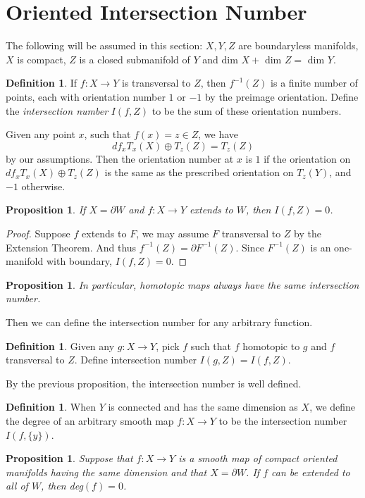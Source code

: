 \documentclass[psamsfonts]{amsart}
\newtheorem{prop}[theorem]{Proposition}
\theoremstyle{definition}
\newtheorem{defn}[theorem]{Definition}
\theoremstyle{remark}
\numberwithin{equation}{section}
\begin{document}
	\section{Oriented Intersection Number}
		The following will be assumed in this section: $X,Y,Z$ are boundaryless manifolds, $X$ is compact, $Z$ is a closed submanifold of $Y$ and dim $X +$ dim $Z = $ dim $Y$.
		\begin{defn}
			If $f: X \to Y$ is transversal to $Z$, then $f^{-1}(Z)$ is a finite number of points, each with orientation number $1$ or $-1$ by the preimage orientation. Define the \textit{intersection number} $I(f,Z)$ to be the sum of these orientation numbers.
		\end{defn}
		Given any point $x$, such that $f(x) = z \in Z$, we have
		\begin{equation}
			df_xT_x(X) \oplus T_z(Z) = T_z(Z)	
		\end{equation}
		by our assumptions. Then the orientation number at $x$ is $1$ if the orientation on $df_xT_x(X) \oplus T_z(Z)$ is the same as the prescribed orientation on $T_z(Y)$, and $-1$ otherwise.\\
		\begin{prop}
			If $X = \partial W$ and $f:X \to Y$ extends to $W$, then $I(f,Z)=0$.
		\end{prop}
		\begin{proof}
			Suppose $f$ extends to $F$, we may assume $F$ transversal to $Z$ by the Extension Theorem. And thus $f^{-1}(Z) = \partial F^{-1}(Z)$. Since $F^{-1}(Z)$ is an one-manifold with boundary, $I(f,Z)=0$. 	
		\end{proof}
		\begin{prop}
			In particular, homotopic maps always have the same intersection number.
		\end{prop}
		Then we can define the intersection number for any arbitrary function.
		\begin{defn}
			Given any $g: X \to Y$, pick $f$ such that $f$ homotopic to $g$ and $f$ transversal to $Z$. Define intersection number $I(g,Z) = I(f,Z)$.
		\end{defn}			 
		By the previous proposition, the intersection number is well defined.
		\begin{defn}
			When $Y$ is connected and has the same dimension as $X$, we define the degree of an arbitrary smooth map $f:X \to Y$ to be the intersection number $I(f,\{y\})$.
		\end{defn}
		\begin{prop}
			Suppose that $f:X \to Y$ is a smooth map of compact oriented manifolds having the same dimension and that $X = \partial W$. If $f$ can be extended to all of $W$, then deg$(f)=0$.
		\end{prop}
\end{document}
